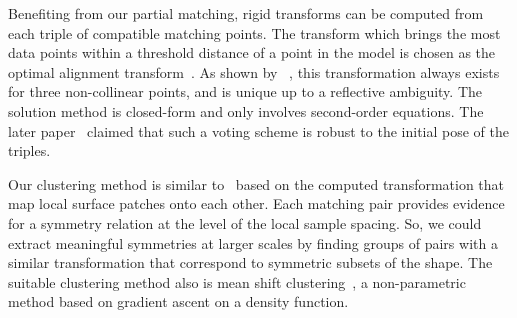 Benefiting from our partial matching, rigid transforms can be computed from each triple of compatible matching points.
The transform which brings the most data points within a threshold distance of a point in the model is chosen as the optimal alignment transform~\cite{Huttenlocher1990}.
As shown by ~\cite{Huttenlocher1990}, this transformation always exists for three non-collinear points, and is unique up to a reflective ambiguity. 
The solution method is closed-form and only involves second-order equations.
The later paper~\cite{Gelfand05} claimed that such a voting scheme is robust to the initial pose of the triples.

Our clustering method is similar to~\cite{mitra2006} based on the computed transformation that map local surface patches onto each other.
Each matching pair provides evidence for a symmetry relation at the level of the local sample spacing. 
So, we could extract meaningful symmetries at larger scales by finding groups of pairs with a similar transformation 
that correspond to symmetric subsets of the shape.
The suitable clustering method also is mean shift clustering~\cite{Comaniciu2002}, a non-parametric method based on gradient ascent on a density function.



